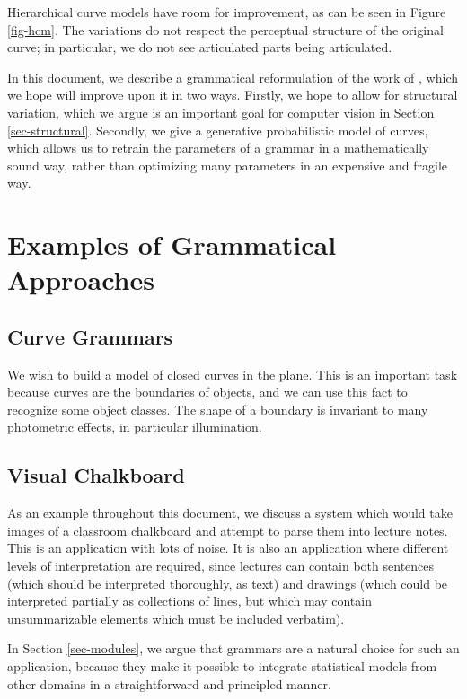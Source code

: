 Hierarchical curve models have room for improvement, as can be seen in
Figure \ref{fig-hcm}. The variations do not respect the perceptual
structure of the original curve; in particular, we do not see
articulated parts being articulated.

In this document, we describe a grammatical reformulation of the work
of \cite{hcm}, which we hope will improve upon it in two
ways. Firstly, we hope to allow for structural variation, which we
argue is an important goal for computer vision in Section
\ref{sec-structural}. Secondly, we give a generative probabilistic model of
curves, which allows us to retrain the parameters of a grammar in a
mathematically sound way, rather than optimizing many parameters in an
expensive and fragile way.

\section{Examples of Grammatical Approaches}

\subsection{Curve Grammars}

We wish to build a model of closed curves in the plane. This is an
important task because curves are the boundaries of objects, and we
can use this fact to recognize some object classes. The shape of a
boundary is invariant to many photometric effects, in particular
illumination. \cite{canny}

\subsection{Visual Chalkboard}

As an example throughout this document, we discuss a system which
would take images of a classroom chalkboard and attempt to parse them
into lecture notes. This is an application with lots of noise. It is
also an application where different levels of interpretation are
required, since lectures can contain both sentences (which should be
interpreted thoroughly, as text) and drawings (which could be
interpreted partially as collections of lines, but which may contain
unsummarizable elements which must be included verbatim).

In Section \ref{sec-modules}, we argue that grammars are a natural
choice for such an application, because they make it possible to
integrate statistical models from other domains in a straightforward
and principled manner.

